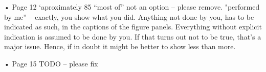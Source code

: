 • Page 12 ‘aproximately 85%
	“most of” not an option – please remove. "performed by me” – exactly, you show what you did. Anything not done by you, has to be indicated as such, in the captions of the figure panels. Everything without explicit indication is assumed to be done by you. If that turns out not to be true, that’s a major issue. Hence, if in doubt it might be better to show less than more. 




• Page 15 TODO – please fix




